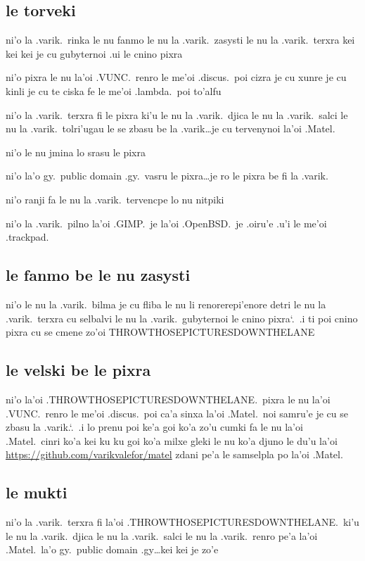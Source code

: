 \documentclass{report}
\newcommand\sds{\spacefactor\sfcode`.\ \space}
\begin{document}
\subsection{le torveki}
ni'o la .varik.\ rinka le nu fanmo le nu la .varik.\ zasysti le nu la .varik.\ terxra kei kei kei je cu gubyternoi .ui le cnino pixra

ni'o pixra le nu la'oi .VUNC.\ renro le me'oi .discus.\ poi cizra je cu xunre je cu kinli je cu te ciska fe le me'oi .lambda.\ poi to'alfu

ni'o la .varik.\ terxra fi le pixra ki'u le nu la .varik.\ djica le nu la .varik.\ salci le nu la .varik.\ tolri'ugau le se zbasu be la .varik\ldots je cu tervenynoi la'oi .Matel.

ni'o le nu jmina lo srasu le pixra

ni'o la'o gy.\ public domain .gy.\ vasru le pixra\ldots je ro le pixra be fi la .varik.

ni'o ranji fa le nu la .varik.\ tervencpe lo nu nitpiki

ni'o la .varik.\ pilno la'oi .GIMP.\ je la'oi .OpenBSD.\ je .oiru'e .u'i le me'oi .trackpad.

\subsection{le fanmo be le nu zasysti}
ni'o le nu la .varik.\ bilma je cu fliba le nu li renorerepi'enore detri le nu la .varik.\ terxra cu selbalvi le nu la .varik.\ gubyternoi le cnino pixra\sds  .i ti poi cnino pixra cu se cmene zo'oi THROWTHOSEPICTURESDOWNTHELANE

\subsection{le velski be le pixra}
ni'o la'oi .THROWTHOSEPICTURESDOWNTHELANE.\ pixra le nu la'oi \linebreak  %
.VUNC.\ renro le me'oi .discus.\ poi ca'a sinxa la'oi .Matel.\ noi samru'e je cu se zbasu la .varik.\sds  .i lo prenu poi ke'a goi ko'a zo'u cumki fa le nu la'oi .Matel.\ cinri ko'a kei ku ku goi ko'a milxe gleki le nu ko'a djuno le du'u la'oi \url{https://github.com/varikvalefor/matel} zdani pe'a le samselpla po la'oi .Matel.

\subsection{le mukti}
ni'o la .varik.\ terxra fi la'oi .THROWTHOSEPICTURESDOWNTHELANE.\ ki'u le nu la .varik.\ djica le nu la .varik.\ salci le nu la .varik.\ renro pe'a la'oi .Matel.\ la'o gy.\ public domain .gy\ldots kei kei je zo'e
\end{document}
